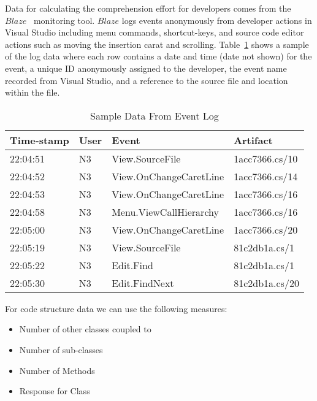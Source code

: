 Data for calculating the comprehension effort for developers comes from the $Blaze$~\cite{Snipes2014Experiences} monitoring tool.  $Blaze$ logs events anonymously from developer actions in Visual Studio including menu commands, shortcut-keys, and source code editor actions such as moving the insertion carat and scrolling.  Table~\ref{fig:SampleEventData} shows a sample of the log data where each row contains a date and time (date not shown) for the event, a unique ID anonymously assigned to the developer, the event name recorded from Visual Studio, and a reference to the source file and location within the file.

\begin{table}
	\centering
	\caption{Sample Data From Event Log}
	\begin{tabular}{|l|l|l|l|}
	\hline

Time-stamp & User & Event & Artifact \\
\hline\hline
22:04:51 & N3 & View.SourceFile & 1acc7366.cs/10 \\
\hline
22:04:52 & N3 & View.OnChangeCaretLine & 1acc7366.cs/14 \\
\hline
22:04:53 & N3 & View.OnChangeCaretLine & 1acc7366.cs/16 \\
\hline
22:04:58 & N3 & Menu.ViewCallHierarchy & 1acc7366.cs/16 \\
\hline
22:05:00 & N3 & View.OnChangeCaretLine & 1acc7366.cs/20 \\
\hline
22:05:19 & N3 & View.SourceFile & 81c2db1a.cs/1 \\
\hline
22:05:22 & N3 & Edit.Find & 81c2db1a.cs/1 \\
\hline
22:05:30 & N3 & Edit.FindNext & 81c2db1a.cs/20 \\
\hline

	\end{tabular}
	\label{fig:SampleEventData}
\end{table}




For code structure data we can use the following measures:
\begin{itemize}
	\item[] Number of other classes coupled to
	\item[] Number of sub-classes
	\item[] Number of Methods
	\item[] Response for Class
\end{itemize}

